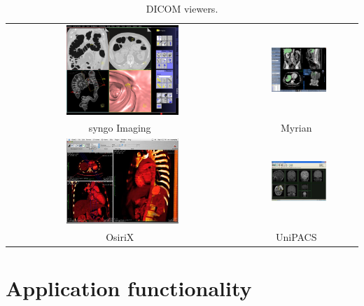 \begin{table}[ht]
	\caption{DICOM viewers.}
	\centering
	\begin{tabular}{cc}
			\includegraphics[width=0.5\textwidth,height=0.375\textwidth]{Text/IMG/01_Siemens.jpg}
		&
			\includegraphics[width=0.5\textwidth,height=0.375\textwidth]{Text/IMG/01_Myrian.jpg}
		\\
			syngo Imaging~\citesec{siemens} & Myrian~\citesec{intrasense}	
		\\
			\includegraphics[width=0.5\textwidth,height=0.375\textwidth]{Text/IMG/01_OsiriX.jpg}
		&
			\includegraphics[width=0.5\textwidth,height=0.375\textwidth]{Text/IMG/01_UniPACS.jpg}
		\\
			OsiriX~\citesec{osirix} & UniPACS~\citesec{unipacs}
		\\
		\end{tabular}
\end{table}%

\section*{Application functionality}
